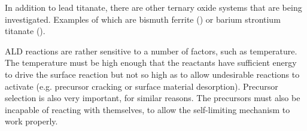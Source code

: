 In addition to lead titanate, there are other ternary oxide systems that are being investigated. Examples of which are bismuth ferrite () or barium strontium titanate ().\cite{chu_nanoscale_2009}

ALD reactions are rather sensitive to a number of factors, such as temperature. The temperature must be high enough that the reactants have sufficient energy to drive the surface reaction but not so high as to allow undesirable reactions to activate (e.g. precursor cracking or surface material desorption). Precursor selection is also very important, for similar reasons. The precursors must also be incapable of reacting with themselves, to allow the self-limiting mechanism to work properly.\cite{ALD-Handbook}


%
%



\lipsum







